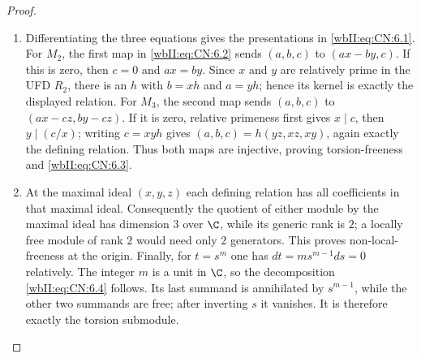 \begin{proof}

\begin{enumerate}[label={$\langle1\rangle$\arabic*.},leftmargin=*]
\item Differentiating the three equations gives the presentations in \eqref{wbII:eq:CN:6.1}.  For
$M_2$, the first map in \eqref{wbII:eq:CN:6.2} sends $(a,b,c)$ to $(ax-by,c)$.  If this is
zero, then $c=0$ and $ax=by$.  Since $x$ and $y$ are relatively prime in the
UFD $R_2$, there is an $h$ with $b=xh$ and $a=yh$; hence its kernel is exactly
the displayed relation.  For $M_3$, the second map sends $(a,b,c)$ to
$(ax-cz,by-cz)$.  If it is zero, relative primeness first gives $x\mid c$,
then $y\mid(c/x)$; writing $c=xyh$ gives
$(a,b,c)=h(yz,xz,xy)$, again exactly the defining relation.  Thus both maps
are injective, proving torsion-freeness and \eqref{wbII:eq:CN:6.3}.

\item At the maximal ideal $(x,y,z)$ each defining relation has all coefficients in
that maximal ideal.  Consequently the quotient of either module by the
maximal ideal has dimension $3$ over $\C$, while its generic rank is $2$;
a locally free module of rank $2$ would need only $2$ generators.  This proves
non-local-freeness at the origin.  Finally, for $t=s^m$ one has
$dt=m s^{m-1}ds=0$ relatively.  The integer $m$ is a unit in $\C$, so the
decomposition \eqref{wbII:eq:CN:6.4} follows.  Its last summand is annihilated by
$s^{m-1}$, while the other two summands are free; after inverting $s$ it
vanishes.  It is therefore exactly the torsion submodule.

\end{enumerate}
\end{proof}
